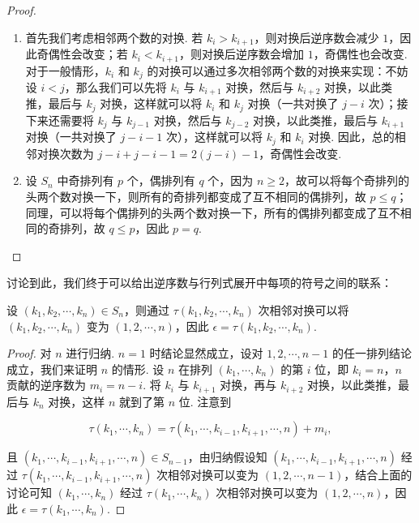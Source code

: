 \begin{proof}
    \begin{enumerate}
        \item 首先我们考虑相邻两个数的对换. 若 $k_i > k_{i+1}$，则对换后逆序数会减少 $1$，因此奇偶性会改变；若 $k_i < k_{i+1}$，则对换后逆序数会增加 $1$，奇偶性也会改变. 对于一般情形，$k_i$ 和 $k_j$ 的对换可以通过多次相邻两个数的对换来实现：不妨设 $i < j$，那么我们可以先将 $k_i$ 与 $k_{i+1}$ 对换，然后与 $k_{i+2}$ 对换，以此类推，最后与 $k_j$ 对换，这样就可以将 $k_i$ 和 $k_j$ 对换（一共对换了 $j-i$ 次）；接下来还需要将 $k_j$ 与 $k_{j-1}$ 对换，然后与 $k_{j-2}$ 对换，以此类推，最后与 $k_{i+1}$ 对换（一共对换了 $j-i-1$ 次），这样就可以将 $k_j$ 和 $k_i$ 对换. 因此，总的相邻对换次数为 $j-i+j-i-1=2(j-i)-1$，奇偶性会改变.
        \item 设 $S_n$ 中奇排列有 $p$ 个，偶排列有 $q$ 个，因为 $n \geqslant 2$，故可以将每个奇排列的头两个数对换一下，则所有的奇排列都变成了互不相同的偶排列，故 $p \leqslant q$；同理，可以将每个偶排列的头两个数对换一下，所有的偶排列都变成了互不相同的奇排列，故 $q \leqslant p$，因此 $p = q$.
    \end{enumerate}
\end{proof}

讨论到此，我们终于可以给出逆序数与行列式展开中每项的符号之间的联系：

\begin{theorem}{}{}
    设 $(k_1,k_2,\cdots,k_n) \in S_n$，则通过 $\tau(k_1,k_2,\cdots,k_n)$ 次相邻对换可以将 $(k_1,k_2,\cdots,k_n)$ 变为 $(1,2,\cdots,n)$，因此 $\epsilon = \tau(k_1,k_2,\cdots,k_n)$.
\end{theorem}

\begin{proof}
    对 $n$ 进行归纳. $n=1$ 时结论显然成立，设对 $1,2,\cdots,n-1$ 的任一排列结论成立，我们来证明 $n$ 的情形. 设 $n$ 在排列 $(k_1,\cdots,k_n)$ 的第 $i$ 位，即 $k_i = n$，$n$ 贡献的逆序数为 $m_i = n - i$. 将 $k_i$ 与 $k_{i+1}$ 对换，再与 $k_{i+2}$ 对换，以此类推，最后与 $k_n$ 对换，这样 $n$ 就到了第 $n$ 位. 注意到

    \[ \tau(k_1,\cdots,k_n) = \tau(k_1,\cdots,k_{i-1},k_{i+1},\cdots,n) + m_i,\]

    且 $(k_1,\cdots,k_{i-1},k_{i+1},\cdots,n) \in S_{n-1}$，由归纳假设知 $(k_1,\cdots,k_{i-1},k_{i+1},\cdots,n)$ 经过 $\tau(k_1,\cdots,k_{i-1},k_{i+1},\cdots,n)$ 次相邻对换可以变为 $(1,2,\cdots,n-1)$，结合上面的讨论可知 $(k_1,\cdots,k_n)$ 经过 $\tau(k_1,\cdots,k_n)$ 次相邻对换可以变为 $(1,2,\cdots,n)$，因此 $\epsilon = \tau(k_1,\cdots,k_n)$.
\end{proof}

